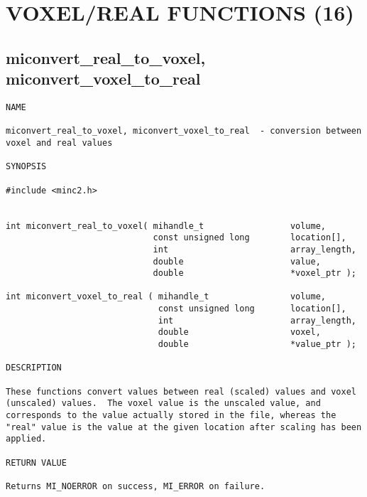 \documentclass{article}
\begin{document}
\section{VOXEL/REAL FUNCTIONS (16)}
\subsection{miconvert\_real\_to\_voxel, miconvert\_voxel\_to\_real}
\begin{verbatim}
NAME 

miconvert_real_to_voxel, miconvert_voxel_to_real  - conversion between
voxel and real values

SYNOPSIS

#include <minc2.h>


int miconvert_real_to_voxel( mihandle_t                 volume,
                             const unsigned long        location[],
                             int                        array_length,
                             double                     value,
                             double                     *voxel_ptr );

int miconvert_voxel_to_real ( mihandle_t                volume, 
                              const unsigned long       location[],
                              int                       array_length,
                              double                    voxel,
                              double                    *value_ptr );

DESCRIPTION

These functions convert values between real (scaled) values and voxel
(unscaled) values.  The voxel value is the unscaled value, and
corresponds to the value actually stored in the file, whereas the
"real" value is the value at the given location after scaling has been
applied.

RETURN VALUE

Returns MI_NOERROR on success, MI_ERROR on failure.
\end{verbatim}
\end{document}
